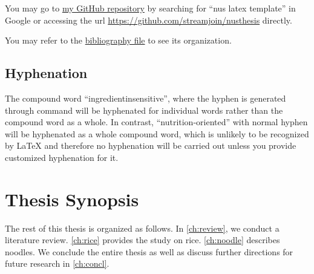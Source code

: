 You may go to \href{https://github.com/streamjoin/nusthesis}{my GitHub repository} by searching for ``nus latex template'' in Google or accessing the url  \url{https://github.com/streamjoin/nusthesis} directly. 

You may refer to the \href{run:./src/references.bib}{bibliography file} to see its organization.  

\subsection{Hyphenation}

The compound word ``ingredient\zz{}insensitive'', where the hyphen is generated through command \CMD{\zz{}} will be hyphenated for individual words rather than the compound word as a whole. 
In contrast, ``nutrition-oriented'' with normal hyphen will be hyphenated as a whole compound word, which is unlikely to be recognized by \LaTeX{} and therefore no hyphenation will be carried out unless you provide customized hyphenation for it. 

\section{Thesis Synopsis}

The rest of this thesis is organized as follows. 
In \autoref{ch:review}, we conduct a literature review. 
\autoref{ch:rice} provides the study on rice. 
\autoref{ch:noodle} describes noodles. 
We conclude the entire thesis as well as discuss further directions for future research in \autoref{ch:concl}.
